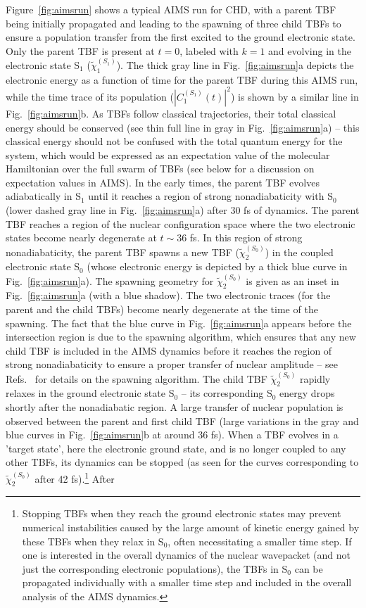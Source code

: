 \documentclass[9pt,bestpractices]{livecoms}
\begin{document}
Figure~\ref{fig:aimsrun} shows a typical AIMS run for CHD, with a parent TBF being initially propagated and leading to the spawning of three child TBFs to ensure a population transfer from the first excited to the ground electronic state. Only the parent TBF is present at $t=0$, labeled with $k=1$ and evolving in the electronic state S$_1$ ($\tilde{\chi}_{1}^{(S_1)}$). The thick gray line in Fig.~\ref{fig:aimsrun}a depicts the electronic energy as a function of time for the parent TBF during this AIMS run, while the time trace of its population ($|C_{1}^{(S_1)}(t)|^2$) is shown by a similar line in Fig.~\ref{fig:aimsrun}b. As TBFs follow classical trajectories, their total classical energy should be conserved (see thin full line in gray in Fig.~\ref{fig:aimsrun}a) -- this classical energy should not be confused with the total quantum energy for the system, which would be expressed as an expectation value of the molecular Hamiltonian over the full swarm of TBFs (see below for a discussion on expectation values in AIMS). In the early times, the parent TBF evolves adiabatically in S$_1$ until it reaches a region of strong nonadiabaticity with S$_0$ (lower dashed gray line in Fig.~\ref{fig:aimsrun}a) after 30 fs of dynamics. The parent TBF reaches a region of the nuclear configuration space where the two electronic states become nearly degenerate at $t\sim36$ fs. In this region of strong nonadiabaticity, the parent TBF spawns a new TBF ($\tilde{\chi}_{2}^{(S_0)}$) in the coupled electronic state S$_0$ (whose electronic energy is depicted by a thick blue curve in Fig.~\ref{fig:aimsrun}a). The spawning geometry for $\tilde{\chi}_{2}^{(S_0)}$ is given as an inset in Fig.~\ref{fig:aimsrun}a (with a blue shadow). The two electronic traces (for the parent and the child TBFs) become nearly degenerate at the time of the spawning. The fact that the blue curve in Fig.~\ref{fig:aimsrun}a appears before the intersection region is due to the spawning algorithm, which ensures that any new child TBF is included in the AIMS dynamics before it reaches the region of strong nonadiabaticity to ensure a proper transfer of nuclear amplitude -- see Refs.~ for details on the spawning algorithm. The child TBF $\tilde{\chi}_{2}^{(S_0)}$ rapidly relaxes in the ground electronic state S$_0$ -- its corresponding S$_0$ energy drops shortly after the nonadiabatic region. A large transfer of nuclear population is observed between the parent and first child TBF (large variations in the gray and blue curves in Fig.~\ref{fig:aimsrun}b at around 36 fs). When a TBF evolves in a 'target state', here the electronic ground state, and is no longer coupled to any other TBFs, its dynamics can be stopped (as seen for the curves corresponding to $\tilde{\chi}_{2}^{(S_0)}$ after 42 fs).\footnote{Stopping TBFs when they reach the ground electronic states may prevent numerical instabilities caused by the large amount of kinetic energy gained by these TBFs when they relax in S$_0$, often necessitating a smaller time step. If one is interested in the overall dynamics of the nuclear wavepacket (and not just the corresponding electronic populations), the TBFs in S$_0$ can be propagated individually with a smaller time step and included in the overall analysis of the AIMS dynamics.} After 
\end{document}
